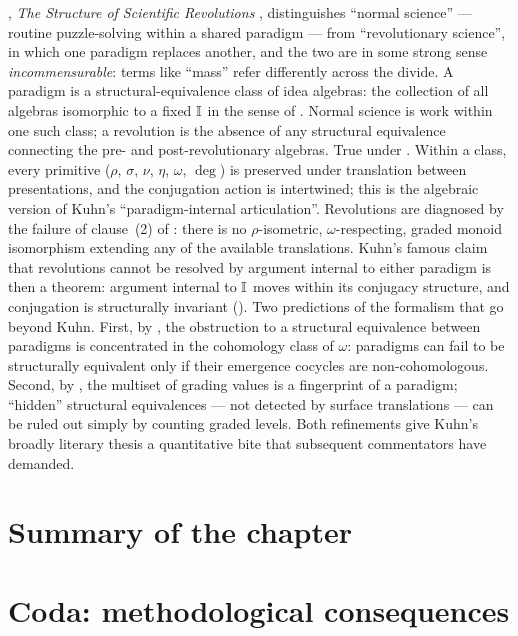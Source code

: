 \begin{zooentry*}
, \emph{The Structure of Scientific Revolutions}
\cite{Kuhn1962}, distinguishes ``normal science'' --- routine
puzzle-solving within a shared paradigm --- from ``revolutionary
science'', in which one paradigm replaces another, and the two are in
some strong sense \emph{incommensurable}: terms like ``mass'' refer
differently across the divide.
\formalclaim A paradigm is a structural-equivalence class of idea
algebras: the collection of all algebras isomorphic to a fixed
$\mathbb{I}$ in the sense of . Normal science is
work within one such class; a revolution is the absence of any
structural equivalence connecting the pre- and post-revolutionary
algebras.
\formalstatus
True under . Within a class, every primitive
($\rho$, $\sigma$, $\nu$, $\eta$, $\omega$, $\deg$) is preserved
under translation between presentations, and the conjugation action
is intertwined; this is the algebraic version of Kuhn's
``paradigm-internal articulation''. Revolutions are diagnosed by the
failure of clause~(2) of : there is no
$\rho$-isometric, $\omega$-respecting, graded monoid isomorphism
extending any of the available translations. Kuhn's famous claim that
revolutions cannot be resolved by argument internal to either
paradigm is then a theorem: argument internal to $\mathbb{I}$ moves
within its conjugacy structure, and conjugation is structurally
invariant ().
\formalclaim
\litcomment
Two predictions of the formalism that go beyond Kuhn. First, by
, the obstruction to a structural
equivalence between paradigms is concentrated in the cohomology
class of $\omega$: paradigms can fail to be structurally equivalent
only if their emergence cocycles are non-cohomologous. Second, by
, the multiset of grading values is a
fingerprint of a paradigm; ``hidden'' structural equivalences --- not
detected by surface translations --- can be ruled out simply by
counting graded levels. Both refinements give Kuhn's broadly literary
thesis a quantitative bite that subsequent commentators
\cite{Lovejoy1936,Koselleck2002} have demanded.
\end{zooentry*}

\section*{Summary of the chapter}

\section{Coda: methodological consequences}\label{sec:coda-ch6}


